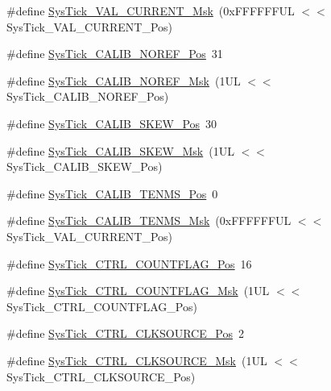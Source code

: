 \begin{DoxyCompactItemize}
\item 
\#define \mbox{\hyperlink{group___c_m_s_i_s___sys_tick_gafc77b56d568930b49a2474debc75ab45}{Sys\+Tick\+\_\+\+V\+A\+L\+\_\+\+C\+U\+R\+R\+E\+N\+T\+\_\+\+Msk}}~(0x\+F\+F\+F\+F\+F\+F\+U\+L $<$$<$ Sys\+Tick\+\_\+\+V\+A\+L\+\_\+\+C\+U\+R\+R\+E\+N\+T\+\_\+\+Pos)
\item 
\#define \mbox{\hyperlink{group___c_m_s_i_s___sys_tick_ga534dbe414e7a46a6ce4c1eca1fbff409}{Sys\+Tick\+\_\+\+C\+A\+L\+I\+B\+\_\+\+N\+O\+R\+E\+F\+\_\+\+Pos}}~31
\item 
\#define \mbox{\hyperlink{group___c_m_s_i_s___sys_tick_ga3af0d891fdd99bcc8d8912d37830edb6}{Sys\+Tick\+\_\+\+C\+A\+L\+I\+B\+\_\+\+N\+O\+R\+E\+F\+\_\+\+Msk}}~(1\+U\+L $<$$<$ Sys\+Tick\+\_\+\+C\+A\+L\+I\+B\+\_\+\+N\+O\+R\+E\+F\+\_\+\+Pos)
\item 
\#define \mbox{\hyperlink{group___c_m_s_i_s___sys_tick_gadd0c9cd6641b9f6a0c618e7982954860}{Sys\+Tick\+\_\+\+C\+A\+L\+I\+B\+\_\+\+S\+K\+E\+W\+\_\+\+Pos}}~30
\item 
\#define \mbox{\hyperlink{group___c_m_s_i_s___sys_tick_ga8a6a85a87334776f33d77fd147587431}{Sys\+Tick\+\_\+\+C\+A\+L\+I\+B\+\_\+\+S\+K\+E\+W\+\_\+\+Msk}}~(1\+U\+L $<$$<$ Sys\+Tick\+\_\+\+C\+A\+L\+I\+B\+\_\+\+S\+K\+E\+W\+\_\+\+Pos)
\item 
\#define \mbox{\hyperlink{group___c_m_s_i_s___sys_tick_gacae558f6e75a0bed5d826f606d8e695e}{Sys\+Tick\+\_\+\+C\+A\+L\+I\+B\+\_\+\+T\+E\+N\+M\+S\+\_\+\+Pos}}~0
\item 
\#define \mbox{\hyperlink{group___c_m_s_i_s___sys_tick_gaf1e68865c5aece2ad58971225bd3e95e}{Sys\+Tick\+\_\+\+C\+A\+L\+I\+B\+\_\+\+T\+E\+N\+M\+S\+\_\+\+Msk}}~(0x\+F\+F\+F\+F\+F\+F\+U\+L $<$$<$ Sys\+Tick\+\_\+\+V\+A\+L\+\_\+\+C\+U\+R\+R\+E\+N\+T\+\_\+\+Pos)
\item 
\#define \mbox{\hyperlink{group___c_m_s_i_s___sys_tick_gadbb65d4a815759649db41df216ed4d60}{Sys\+Tick\+\_\+\+C\+T\+R\+L\+\_\+\+C\+O\+U\+N\+T\+F\+L\+A\+G\+\_\+\+Pos}}~16
\item 
\#define \mbox{\hyperlink{group___c_m_s_i_s___sys_tick_ga1bf3033ecccf200f59baefe15dbb367c}{Sys\+Tick\+\_\+\+C\+T\+R\+L\+\_\+\+C\+O\+U\+N\+T\+F\+L\+A\+G\+\_\+\+Msk}}~(1\+U\+L $<$$<$ Sys\+Tick\+\_\+\+C\+T\+R\+L\+\_\+\+C\+O\+U\+N\+T\+F\+L\+A\+G\+\_\+\+Pos)
\item 
\#define \mbox{\hyperlink{group___c_m_s_i_s___sys_tick_ga24fbc69a5f0b78d67fda2300257baff1}{Sys\+Tick\+\_\+\+C\+T\+R\+L\+\_\+\+C\+L\+K\+S\+O\+U\+R\+C\+E\+\_\+\+Pos}}~2
\item 
\#define \mbox{\hyperlink{group___c_m_s_i_s___sys_tick_gaa41d06039797423a46596bd313d57373}{Sys\+Tick\+\_\+\+C\+T\+R\+L\+\_\+\+C\+L\+K\+S\+O\+U\+R\+C\+E\+\_\+\+Msk}}~(1\+U\+L $<$$<$ Sys\+Tick\+\_\+\+C\+T\+R\+L\+\_\+\+C\+L\+K\+S\+O\+U\+R\+C\+E\+\_\+\+Pos)

\end{DoxyCompactItemize}
